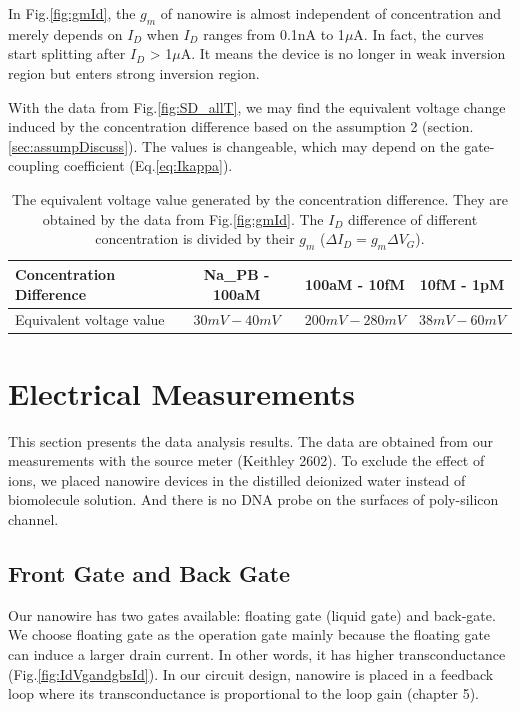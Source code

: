 In Fig.\ref{fig:gmId}, the $g_m$ of nanowire is almost independent of concentration and merely depends on $I_D$ when $I_D$ ranges from 0.1nA to 1$\mu$A.
In fact, the curves start splitting after $I_D$ > 1$\mu$A.
It means the device is no longer in weak inversion region but enters strong inversion region.

With the data from Fig.\ref{fig:SD_allT}, we may find the equivalent voltage change induced by the concentration difference based on the assumption 2 (section.\ref{sec:assumpDiscuss}).
The values is changeable, which may depend on the gate-coupling coefficient (Eq.\ref{eq:Ikappa}).
\begin{table}[tbh]
    {\fontfamily{}\fontsize{10}{14}\selectfont
    \centering
    \begin{tabular}{l|c|c|c}
        Concentration Difference & Na\_PB - 100aM & 100aM - 10fM & 10fM - 1pM \\
        \hline
        Equivalent voltage value & $30mV - 40mV$ & $200mV - 280mV$ & $38mV - 60mV$ \\
    \end{tabular}
    \caption{The equivalent voltage value generated by the concentration difference. They are obtained by the data from Fig.\ref{fig:gmId}. The $I_D$ difference of different concentration is divided by their $g_m$ ($\Delta I_D = g_m\Delta V_G$).}
    \label{tb:CdV}
    }
\end{table}










\section{Electrical Measurements}
This section presents the data analysis results.
The data are obtained from our measurements with the source meter (Keithley 2602).
To exclude the effect of ions, we placed nanowire devices in the distilled deionized water instead of biomolecule solution.
And there is no DNA probe on the surfaces of poly-silicon channel.

\subsection{Front Gate and Back Gate}
Our nanowire has two gates available: floating gate (liquid gate) and back-gate.
We choose floating gate as the operation gate mainly because the floating gate can induce a larger drain current.
In other words, it has higher transconductance (Fig.\ref{fig:IdVgandgbsId}).
In our circuit design, nanowire is placed in a feedback loop where its transconductance is proportional to the loop gain (chapter 5).

